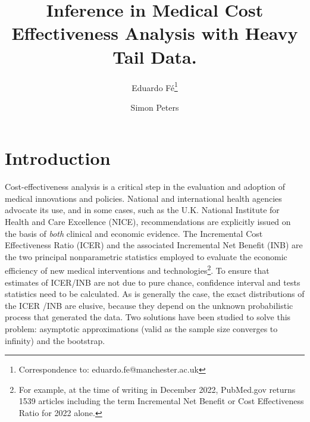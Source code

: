 \documentclass[english, 11pt,a4paper, ]{article}
\begin{document}
\onehalfspacing
\title{Inference in Medical Cost Effectiveness Analysis with Heavy Tail Data.}


\author[1]{Eduardo F\'e\footnote{Correspondence to: eduardo.fe@manchester.ac.uk}}
\author[2]{Simon Peters}
 

 



\maketitle
\begin{abstract}
\end{abstract}
\newpage
\section{Introduction}

Cost-effectiveness analysis is a critical step in the evaluation and adoption of medical innovations and policies. National and international health agencies advocate its use, and  in some cases, such as the U.K. National Institute for Health and Care Excellence (NICE), recommendations are explicitly issued on the basis of \textit{both} clinical and economic evidence. The Incremental Cost Effectiveness Ratio (ICER) and the associated Incremental Net Benefit (INB) are the two principal nonparametric statistics employed to evaluate the economic efficiency of new medical interventions and technologies\footnote{For example, at the time of writing in December 2022, PubMed.gov returns 1539 articles including the term Incremental Net Benefit or Cost Effectiveness Ratio for 2022 alone.}. To ensure that estimates of ICER/INB are not due to pure chance, confidence interval and tests statistics need to be calculated. As is generally the case, the exact distributions of the ICER /INB are elusive, because they depend on the unknown probabilistic process that generated the data. Two solutions have been studied to solve this problem: asymptotic approximations (valid as the sample size converges to infinity) and the bootstrap. 
\end{document}
